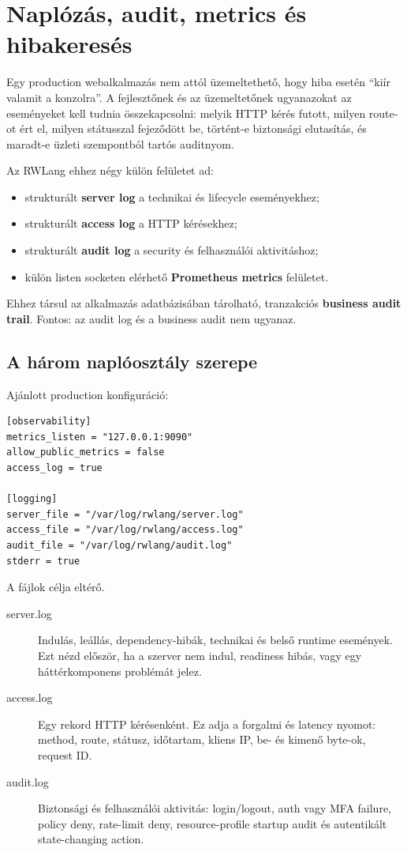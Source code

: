 \chapter{Naplózás, audit, metrics és hibakeresés}

Egy production webalkalmazás nem attól üzemeltethető, hogy hiba esetén ``kiír valamit a konzolra''. A fejlesztőnek és az üzemeltetőnek ugyanazokat az eseményeket kell tudnia összekapcsolni: melyik HTTP kérés futott, milyen route-ot ért el, milyen státusszal fejeződött be, történt-e biztonsági elutasítás, és maradt-e üzleti szempontból tartós auditnyom.

Az RWLang ehhez négy külön felületet ad:

\begin{itemize}
  \item strukturált \textbf{server log} a technikai és lifecycle eseményekhez;
  \item strukturált \textbf{access log} a HTTP kérésekhez;
  \item strukturált \textbf{audit log} a security és felhasználói aktivitáshoz;
  \item külön listen socketen elérhető \textbf{Prometheus metrics} felületet.
\end{itemize}

Ehhez társul az alkalmazás adatbázisában tárolható, tranzakciós \textbf{business audit trail}. Fontos: az audit log és a business audit nem ugyanaz.

\section{A három naplóosztály szerepe}

Ajánlott production konfiguráció:

\begin{lstlisting}
[observability]
metrics_listen = "127.0.0.1:9090"
allow_public_metrics = false
access_log = true

[logging]
server_file = "/var/log/rwlang/server.log"
access_file = "/var/log/rwlang/access.log"
audit_file = "/var/log/rwlang/audit.log"
stderr = true
\end{lstlisting}

A fájlok célja eltérő.

\begin{description}
  \item[server.log] Indulás, leállás, dependency-hibák, technikai és belső runtime események. Ezt nézd először, ha a szerver nem indul, readiness hibás, vagy egy háttérkomponens problémát jelez.
  \item[access.log] Egy rekord HTTP kérésenként. Ez adja a forgalmi és latency nyomot: method, route, státusz, időtartam, kliens IP, be- és kimenő byte-ok, request ID.
  \item[audit.log] Biztonsági és felhasználói aktivitás: login/logout, auth vagy MFA failure, policy deny, rate-limit deny, resource-profile startup audit és autentikált state-changing action.
\end{description}

